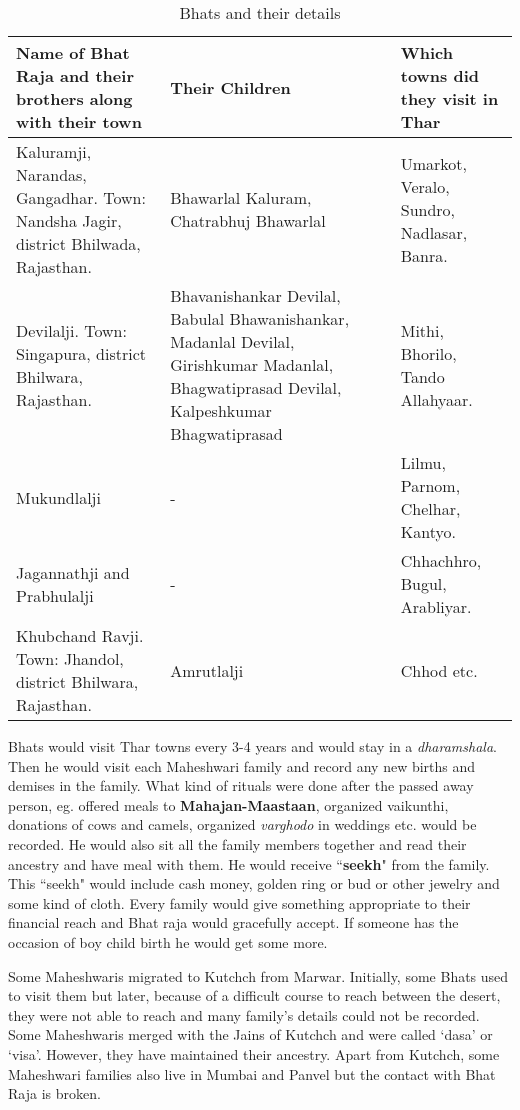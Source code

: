 \begin{table}
\begin{center}
\hspace*{-2cm}\begin{tabular}{p{5.5cm}|p{5.5cm}|p{5.5cm}}
\hline
\textbf{Name of Bhat Raja and their brothers along with their town} &
\textbf{Their Children} & \textbf{Which towns did they visit in Thar}\\
\hline
Kaluramji, Narandas, Gangadhar. Town: Nandsha Jagir, district Bhilwada, Rajasthan. &
Bhawarlal Kaluram, Chatrabhuj Bhawarlal &
Umarkot, Veralo, Sundro, Nadlasar, Banra.\\
\hline
Devilalji. Town: Singapura, district Bhilwara, Rajasthan. & Bhavanishankar Devilal, Babulal Bhawanishankar, Madanlal Devilal, Girishkumar Madanlal, Bhagwatiprasad Devilal, Kalpeshkumar Bhagwatiprasad &
Mithi, Bhorilo, Tando Allahyaar.\\
\hline
Mukundlalji &
- &
Lilmu, Parnom, Chelhar, Kantyo.\\
\hline
Jagannathji and Prabhulalji &
- &
Chhachhro, Bugul, Arabliyar.\\
\hline
Khubchand Ravji. Town: Jhandol, district Bhilwara, Rajasthan. &
Amrutlalji &
Chhod etc.\\
\hline
\end{tabular}
\end{center}
\caption{Bhats and their details}
\label{tbl:bhats}
\end{table}
%
Bhats would visit Thar towns every 3-4 years and would stay in a
\textit{dharamshala}. Then he would visit each Maheshwari family and record any
new births and demises in the family. What kind of rituals were done after the
passed away person, eg. offered meals to \textbf{Mahajan-Maastaan}, organized
vaikunthi, donations of cows and camels, organized \textit{varghodo} in
weddings etc. would be recorded. He would also sit all the family members
together and read their ancestry and have meal with them. He would receive
``\textbf{seekh}" from the family. This ``seekh" would include cash money,
golden ring or bud or other jewelry and some kind of cloth. Every family would
give something appropriate to their financial reach and Bhat raja would
gracefully accept. If someone has the occasion of boy child birth he would get
some more.

Some Maheshwaris migrated to Kutchch from Marwar. Initially, some Bhats used to
visit them but later, because of a difficult course to reach between the
desert, they were not able to reach and many family's details could not be
recorded. Some Maheshwaris merged with the Jains of Kutchch and were called
`dasa' or `visa'. However, they have maintained their ancestry. Apart from
Kutchch, some Maheshwari families also live in Mumbai and Panvel but the
contact with Bhat Raja is broken.

